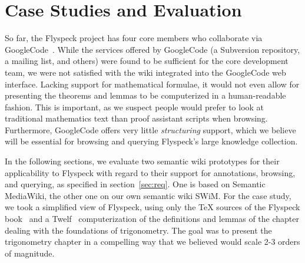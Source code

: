 
\section{Case Studies and Evaluation}

\begin{background}
So far, the Flyspeck project has four core members who collaborate via
GoogleCode~\cite{website:FlyspeckProjectPage}.  While the services offered by
GoogleCode (a Subversion repository, a mailing list, and others) were found to
be sufficient for the core development team, we were not satisfied with the wiki
integrated into the GoogleCode web interface.  Lacking support for mathematical
formulae, it would not even allow for presenting the theorems and lemmas to be
computerized in a human-readable fashion.  This is important, as we suspect
people would prefer to look at traditional mathematics text than proof assistant
scripts when browsing.  Furthermore, GoogleCode offers very little
\emph{structuring} support, which we believe will be essential for browsing and
querying Flyspeck's large knowledge collection.
\end{background}


\begin{contribution}
In the following sections, we evaluate two semantic wiki prototypes for their
applicability to Flyspeck with regard to their support for annotations,
browsing, and querying, as specified in section~\ref{sec:req}.  One is based on
Semantic MediaWiki, the other one on our own semantic wiki SWiM.  For the case
study, we took a simplified view of Flyspeck, using only the {\TeX} sources of
the Flyspeck book~\cite{Hales:2008:FlyspeckBook} and a
Twelf~\cite{Schurmann:1999:Twelf} computerization of the definitions and lemmas
of the chapter dealing with the foundations of trigonometry.  The goal was to
present the trigonometry chapter in a compelling way that we believed would
scale 2-3 orders of magnitude.
\end{contribution}

